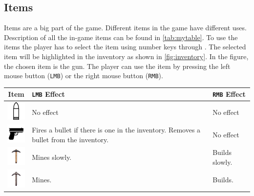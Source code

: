 \subsection{Items}
Items are a big part of the game.
Different items in the game have different uses.
Description of all the in-game items can be found in \autoref{tab:mytable}.
To use the items the player has to select the item using number keys  through .
The selected item will be highlighted in the inventory as shown in \autoref{fig:inventory}.
In the figure, the chosen item is the gun.
The player can use the item by pressing the left mouse button (\texttt{LMB}) or the right mouse button (\texttt{RMB}).

\begin{table}[h]
    \centering
    \begin{tabular}{|c|p{5cm}|p{5cm}|}
        \hline
        Item                                                                         & \texttt{LMB} Effect                                                                   & \texttt{RMB} Effect \\
        \hline
        \includegraphics[width=1cm]{sections/user_manual/resources/bullet.png}       & No effect                                                                             & No effect           \\
        \hline
        \includegraphics[width=1cm]{sections/user_manual/resources/pistol.png}       & Fires a bullet if there is one in the inventory. Removes a bullet from the inventory. & No effect           \\
        \hline
        \includegraphics[width=1cm]{sections/user_manual/resources/pickaxe-slow.png} & Mines slowly.                                                                         & Builds slowly.      \\
        \hline
        \includegraphics[width=1cm]{sections/user_manual/resources/pickaxe-mid.png}  & Mines.                                                                                & Builds.             \\

\end{tabular}
\end{table}
